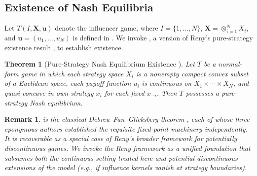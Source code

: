 \documentclass{article}
\newtheorem{theorem}{Theorem}[section]
\newtheorem{remark}{Remark}
\begin{document}
        \subsection{Existence of Nash Equilibria}
            Let $T(I,\mathbf{X},\mathbf{u})$ denote the influencer game, where $I = \{1,\ldots,N\}$, $\mathbf{X} = \otimes_{i=1}^N X_i$, and $\mathbf{u} = (u_1,\ldots,u_N)$ is defined in . We invoke , a version of Reny's pure-strategy existence result \cite{reny1999existence,reny2020nash}, to establish existence.
            \begin{theorem}[Pure-Strategy Nash Equilibrium Existence \cite{debreu1952social,fan1952fixed,glicksberg1952further}]\label{thm:SI_Reny}
                Let $T$ be a normal-form game in which each strategy space $X_i$ is a nonempty compact convex subset of a Euclidean space, each payoff function $u_i$ is continuous on $X_1 \times \cdots \times X_N$, and quasi-concave in own strategy $x_i$ for each fixed $x_{-i}$. Then $T$ possesses a pure-strategy Nash equilibrium.
            \end{theorem}

            \begin{remark}
                 is the classical Debreu--Fan--Glicksberg theorem \cite{debreu1952social,fan1952fixed,glicksberg1952further}, each of whose three eponymous authors established the requisite fixed-point machinery independently. It is recoverable as a special case of Reny's broader framework \cite{reny1999existence,reny2016nash,reny2020nash} for potentially discontinuous games. We invoke the Reny framework as a unified foundation that subsumes both the continuous setting treated here and potential discontinuous extensions of the model (e.g., if influence kernels vanish at strategy boundaries).
            \end{remark}
\end{document}
